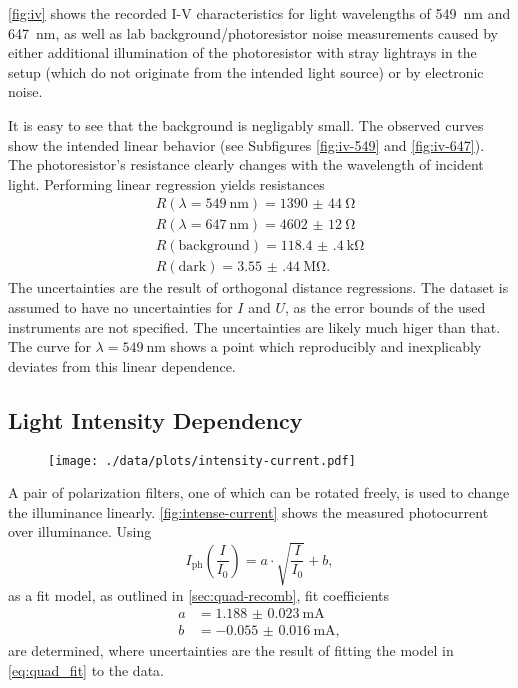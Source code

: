 \autoref{fig:iv} shows the recorded I-V characteristics for light wavelengths of \SI{549}{\nm} and \SI{647}{\nm}, as well as lab background/photoresistor noise measurements caused by either additional illumination of the photoresistor with stray lightrays in the setup (which do not originate from the intended light source) or by electronic noise.

It is easy to see that the background is negligably small.
The observed curves show the intended linear behavior (see Subfigures \ref{fig:iv-549} and \ref{fig:iv-647}).
The photoresistor's resistance clearly changes with the wavelength of incident light.
Performing linear regression yields resistances
\begin{align*}
  R(\lambda = \SI{549}{\nm}) = \SI{1390(44)}{\ohm} \\
  R(\lambda = \SI{647}{\nm}) = \SI{4602(12)}{\ohm} \\
  R(\text{background}) = \SI{118.4(4)}{\kilo\ohm} \\
  R(\text{dark}) = \SI{3.55(44)}{\mega\ohm}.
\end{align*}
The uncertainties are the result of orthogonal distance regressions.
The dataset is assumed to have no uncertainties for $I$ and $U$, as the error bounds of the used instruments are not specified.
The uncertainties are likely much higer than that.
The curve for $\lambda=\SI{549}{\nm}$ shows a point which reproducibly and inexplicably deviates from this linear dependence.

\subsection{Light Intensity Dependency}
\begin{figure}
	\centering
	\texttt{[image: ./data/plots/intensity-current.pdf]}
	\label{fig:intense-current}
\end{figure}
A pair of polarization filters, one of which can be rotated freely, is used to change the illuminance linearly.
\autoref{fig:intense-current} shows the measured photocurrent over illuminance.
Using
\begin{equation}\label{eq:quad_fit}
	I_\text{ph}\left(\frac{I}{I_0}\right) = a\cdot\sqrt{\frac{I}{I_0}} + b,
\end{equation}
as a fit model, as outlined in \autoref{sec:quad-recomb}, fit coefficients
\begin{align*}
	a &= \SI{1.188(23)}{\mA}	\\
	b &= \SI{-0.055(16)}{\mA},
\end{align*}
are determined, where uncertainties are the result of fitting the model in \autoref{eq:quad_fit} to the data.

